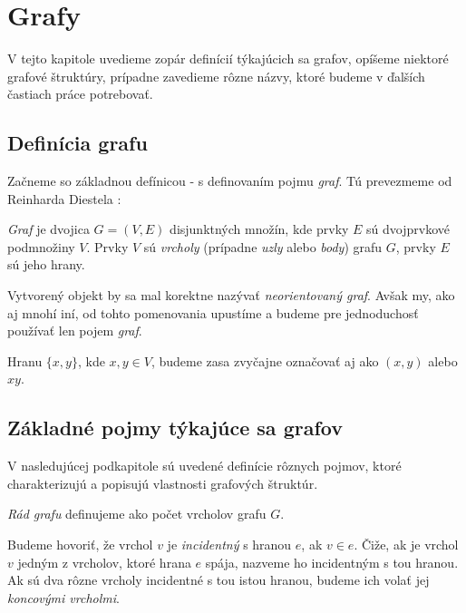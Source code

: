 \chapter{Grafy}
\label{kap:grafy}

V tejto kapitole uvedieme zopár definícií týkajúcich sa grafov, opíšeme niektoré grafové štruktúry, prípadne zavedieme rôzne názvy, ktoré budeme v ďalších častiach práce potrebovať.

\section{Definícia grafu}

Začneme so základnou defínicou - s definovaním pojmu \textit{graf}. Tú prevezmeme od Reinharda Diestela \cite[kapitola 0.1]{Diestel2000}: \newline

\textit{Graf} je dvojica $G = (V, E)$ disjunktných množín, kde prvky $E$ sú dvojprvkové podmnožiny $V$. Prvky $V$ sú \textit{vrcholy} (prípadne \textit{uzly} alebo \textit{body}) grafu $G$, prvky $E$ sú jeho hrany. \newline

Vytvorený objekt by sa mal korektne nazývať \textit{neorientovaný graf}. Avšak my, ako aj mnohí iní, od tohto pomenovania upustíme a budeme pre jednoduchosť používať len pojem \textit{graf}.\newline

Hranu $\{x, y\}$, kde $x,y\in V$, budeme zasa zvyčajne označovať aj ako $(x, y)$ alebo $xy$.

\section{Základné pojmy týkajúce sa grafov}

V nasledujúcej podkapitole sú uvedené definície rôznych pojmov, ktoré charakterizujú a popisujú vlastnosti grafových štruktúr.\newline

\textit{Rád grafu} definujeme ako počet vrcholov grafu $G$.\newline

Budeme hovoriť, že vrchol $v$ je \textit{incidentný} s hranou $e$, ak $v \in e$. Čiže, ak je vrchol $v$ jedným z vrcholov, ktoré hrana $e$ spája, nazveme ho incidentným s tou hranou. Ak sú dva rôzne vrcholy incidentné s tou istou hranou, budeme ich volať jej \textit{koncovými vrcholmi}.\newline

